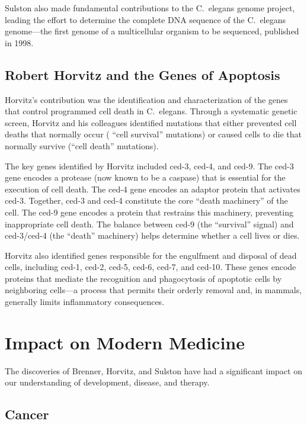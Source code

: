 Sulston also made fundamental contributions to the C.\ elegans genome project, leading the effort to determine the complete DNA sequence of the C.\ elegans genome---the first genome of a multicellular organism to be sequenced, published in 1998.

\subsection{Robert Horvitz and the Genes of Apoptosis}

Horvitz's contribution was the identification and characterization of the genes that control programmed cell death in C.\ elegans. Through a systematic genetic screen, Horvitz and his colleagues identified mutations that either prevented cell deaths that normally occur ( ``cell survival'' mutations) or caused cells to die that normally survive (``cell death'' mutations).

The key genes identified by Horvitz included ced-3, ced-4, and ced-9. The ced-3 gene encodes a protease (now known to be a caspase) that is essential for the execution of cell death. The ced-4 gene encodes an adaptor protein that activates ced-3. Together, ced-3 and ced-4 constitute the core ``death machinery'' of the cell. The ced-9 gene encodes a protein that restrains this machinery, preventing inappropriate cell death. The balance between ced-9 (the ``survival'' signal) and ced-3/ced-4 (the ``death'' machinery) helps determine whether a cell lives or dies.

Horvitz also identified genes responsible for the engulfment and disposal of dead cells, including ced-1, ced-2, ced-5, ced-6, ced-7, and ced-10. These genes encode proteins that mediate the recognition and phagocytosis of apoptotic cells by neighboring cells---a process that permits their orderly removal and, in mammals, generally limits inflammatory consequences.

\section{Impact on Modern Medicine}

The discoveries of Brenner, Horvitz, and Sulston have had a significant impact on our understanding of development, disease, and therapy.

\subsection{Cancer}


